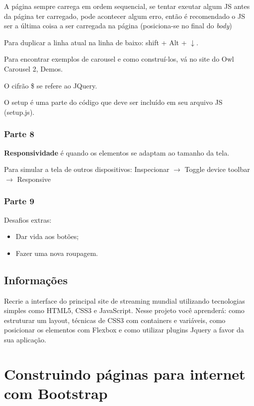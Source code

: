\documentclass[12pt,a4paper]{article}
\begin{document}
	A página sempre carrega em ordem sequencial, se tentar exeutar algum JS antes da página ter carregado, pode acontecer algum erro, então é recomendado o JS ser a última coisa a ser carregada na página (posiciona-se no final do \textit{body})
	
	Para duplicar a linha atual na linha de baixo: shift + Alt + $\downarrow$.
	
	Para encontrar exemplos de carousel e como construí-los, vá no site do Owl Carousel 2, Demos.
	
	O cifrão \$ se refere ao JQuery.
	
	O setup é uma parte do código que deve ser incluído em seu arquivo JS (setup.js).
	
	\subsubsection{Parte 8}
	
	\textbf{Responsividade} é quando os elementos se adaptam ao tamanho da tela.
	
	Para simular a tela de outros dispositivos: Inspecionar $\rightarrow$ Toggle device toolbar $\rightarrow$ Responsive
	
	\subsubsection{Parte 9}
	
	Desafios extras:
	\begin{itemize}
		\item Dar vida aos botões;
		\item Fazer uma nova roupagem.
	\end{itemize}
	
	\subsection{Informações}
	
	Recrie a interface do principal site de streaming mundial utilizando tecnologias simples como HTML5, CSS3 e JavaScript. Nesse projeto você aprenderá: como estruturar um layout, técnicas de CSS3 com containers e variáveis, como posicionar os elementos com Flexbox e como utilizar plugins Jquery a favor da sua aplicação.
	
	\section{Construindo páginas para internet com Bootstrap}
	
\end{document}
